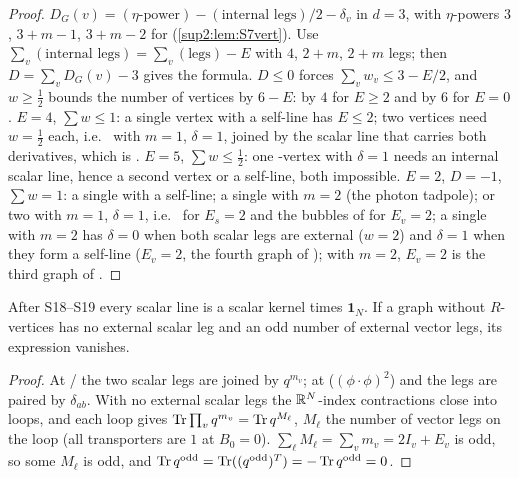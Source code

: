 \begin{proof}
$D_G(v)=(\eta\text{-power})-(\text{internal legs})/2-\delta_v$ in $d=3$, with $\eta$-powers $3$, $3+m-1$, $3+m-2$ for \cite[(1.6), (1.8), (1.10)]{Ba3} (\cref{sup2:lem:S7vert}). Use $\sum_v(\text{internal legs})=\sum_v(\text{legs})-E$ with $4$, $2+m$, $2+m$ legs; then $D=\sum_vD_G(v)-3$ gives the formula. $D\le0$ forces $\sum_vw_v\le3-E/2$, and $w\ge\frac12$ bounds the number of vertices by $6-E$: by $4$ for $E\ge2$ and by $6$ for $E=0$. $E=4$, $\sum w\le1$: a single vertex with a self-line has $E\le2$; two vertices need $w=\frac12$ each, i.e.\ \cite[(1.8)]{Ba3} with $m=1$, $\delta=1$, joined by the scalar line that carries both derivatives, which is \cite[(2.4)]{Ba3}. $E=5$, $\sum w\le\frac12$: one \cite[(1.8)]{Ba3}-vertex with $\delta=1$ needs an internal scalar line, hence a second vertex or a self-line, both impossible. $E=2$, $D=-1$, $\sum w=1$: a single \cite[(1.6)]{Ba3} with a self-line; a single \cite[(1.10)]{Ba3} with $m=2$ (the photon tadpole); or two \cite[(1.8)]{Ba3} with $m=1$, $\delta=1$, i.e.\ \cite[(3.8)]{Ba3} for $E_s=2$ and the bubbles of \cite[(3.25)]{Ba3} for $E_v=2$; a single \cite[(1.8)]{Ba3} with $m=2$ has $\delta=0$ when both scalar legs are external ($w=2$) and $\delta=1$ when they form a self-line ($E_v=2$, the fourth graph of \cite[(3.25)]{Ba3}); \cite[(1.10)]{Ba3} with $m=2$, $E_v=2$ is the third graph of \cite[(3.25)]{Ba3}.
\end{proof}

\begin{lemma}[{$C$-parity; \cite[p.~434]{Ba3}: ``$\operatorname{tr}q^{2n+1}=0$''}]\label{sup4:lem:S212}
After S18--S19 every scalar line is a scalar kernel times $\mathbf 1_N$. If a graph without $R$-vertices has no external scalar leg and an odd number of external vector legs, its expression vanishes.
\end{lemma}

\begin{proof}
At \cite[(1.8)]{Ba3}/\cite[(1.10)]{Ba3} the two scalar legs are joined by $q^{m_v}$; at \cite[(1.6)]{Ba3} ($(\phi\cdot\phi)^2$) and \cite[(1.7)]{Ba3} the legs are paired by $\delta_{ab}$. With no external scalar legs the $\mathbb R^N$-index contractions close into loops, and each loop gives $\operatorname{Tr}\prod_vq^{m_v}=\operatorname{Tr} q^{M_\ell}$, $M_\ell$ the number of vector legs on the loop (all transporters are $1$ at $B_0=0$). $\sum_\ell M_\ell=\sum_vm_v=2I_v+E_v$ is odd, so some $M_\ell$ is odd, and $\operatorname{Tr} q^{\mathrm{odd}}=\operatorname{Tr}((q^{\mathrm{odd}})^T)=-\operatorname{Tr} q^{\mathrm{odd}}=0$.
\end{proof}

